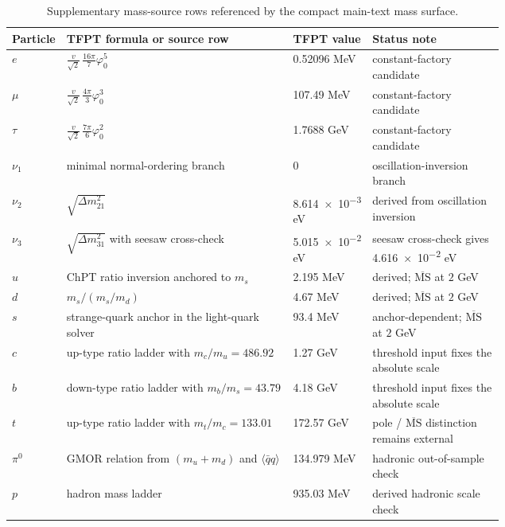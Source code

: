 \documentclass[11pt,a4paper]{article}
\theoremstyle{definition}
\theoremstyle{remark}
\newcommand{\phiz}{\varphi_0}
\begin{document}
\begin{table}[H]
\centering
\scriptsize
\begin{tabularx}{\linewidth}{@{}>{\raggedright\arraybackslash}p{0.10\linewidth}>{\raggedright\arraybackslash}p{0.46\linewidth}>{\raggedleft\arraybackslash}p{0.16\linewidth}Y@{}}
\toprule
Particle & TFPT formula or source row & TFPT value & Status note \\
\midrule
$e$ & $\tfrac{v}{\sqrt2}\,\tfrac{16\pi}{7}\phiz^5$ & \num{0.52096} MeV & constant-factory candidate \\
$\mu$ & $\tfrac{v}{\sqrt2}\,\tfrac{4\pi}{3}\phiz^3$ & \num{107.49} MeV & constant-factory candidate \\
$\tau$ & $\tfrac{v}{\sqrt2}\,\tfrac{7\pi}{6}\phiz^2$ & \num{1.7688} GeV & constant-factory candidate \\
$\nu_1$ & minimal normal-ordering branch & $0$ & oscillation-inversion branch \\
$\nu_2$ & $\sqrt{\Delta m_{21}^2}$ & \num{8.614e-3} eV & derived from oscillation inversion \\
$\nu_3$ & $\sqrt{\Delta m_{31}^2}$ with seesaw cross-check & \num{5.015e-2} eV & seesaw cross-check gives \num{4.616e-2} eV \\
$u$ & ChPT ratio inversion anchored to $m_s$ & \num{2.195} MeV & derived; $\overline{\mathrm{MS}}$ at $2$ GeV \\
$d$ & $m_s/(m_s/m_d)$ & \num{4.67} MeV & derived; $\overline{\mathrm{MS}}$ at $2$ GeV \\
$s$ & strange-quark anchor in the light-quark solver & \num{93.4} MeV & anchor-dependent; $\overline{\mathrm{MS}}$ at $2$ GeV \\
$c$ & up-type ratio ladder with $m_c/m_u=\num{486.92}$ & \num{1.27} GeV & threshold input fixes the absolute scale \\
$b$ & down-type ratio ladder with $m_b/m_s=\num{43.79}$ & \num{4.18} GeV & threshold input fixes the absolute scale \\
$t$ & up-type ratio ladder with $m_t/m_c=\num{133.01}$ & \num{172.57} GeV & pole / $\overline{\mathrm{MS}}$ distinction remains external \\
$\pi^0$ & GMOR relation from $(m_u+m_d)$ and $\langle\bar qq\rangle$ & \num{134.979} MeV & hadronic out-of-sample check \\
$p$ & hadron mass ladder & \num{935.03} MeV & derived hadronic scale check \\
\bottomrule
\end{tabularx}
\caption{Supplementary mass-source rows referenced by the compact main-text mass surface.}
\label{tab:mass-source-supplement}
\end{table}
\end{document}
